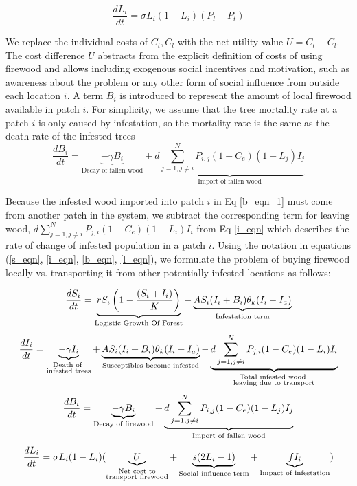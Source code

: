 $$\frac{d L_i}{dt} = \sigma L_i (1 - L_i) (P_l - P_t)$$


We replace the individual costs of $C_t, C_l$ with the net utility value $U = C_t - C_l$. The cost difference $U$ abstracts from the explicit definition of costs of using firewood \cite{barlow2014modelling} and allows including exogenous social incentives and motivation, such as awareness about the problem or any other form of social influence from outside each location $i$.
A term $B_i$ is introduced to represent the amount of local firewood available in patch $i$. For simplicity, we assume that the tree mortality rate at a patch $i$ is only caused by infestation, so the mortality rate is the same as the death rate of the infested trees
\begin{equation}
\label{b_eqn_1}
\frac{d B_i}{dt} = \underbrace{-\gamma B_i}_{\text{Decay of fallen wood}} + \underbrace{d\sum_{j = 1, j\neq i}^N P_{i,j} (1 - C_e) (1 - L_j)I_j}_{\text{Import of fallen wood}}
\end{equation}

Because the infested wood imported into patch $i$ in Eq \ref{b_eqn_1} must come from another patch in the system, we subtract the corresponding term for leaving wood, $d\sum_{j = 1, j\neq i}^N P_{j,i} (1 - C_e) (1 - L_i)I_i$  from Eq \ref{i_eqn} which describes the rate of change of infested population in a patch $i$. Using the notation in equations (\ref{s_eqn}, \ref{i_eqn}, \ref{b_eqn}, \ref{l_eqn}), we formulate the problem of buying firewood locally vs. transporting it from other potentially infested locations as follows: 

\begin{equation}
\frac{d S_i}{dt} = \underbrace{ r S_i\left(1 - \frac{(S_i + I_i)}{K}\right)}_{\text{Logistic Growth Of Forest}} - \underbrace{A S_i (I_i+ B_i)\theta_k(I_i - I_a)}_{\text{Infestation term}}
\protect \label{s_eqn}
\end{equation}
\begin{equation}
\frac{d I_i}{dt} = \underbrace{-\gamma I_i}_{\substack{\text{Death of }\\\text{infested trees}}} + \underbrace{A S_i (I_i+ B_i)\theta_k(I_i - I_a)}_{\text{Susceptibles become infested}}- \underbrace{d\sum_{j = 1, j\neq i}^N P_{j,i} (1 - C_e) (1 - L_i)I_i}_{\substack{\text{Total infested wood }\\\text{leaving due to transport}}}
\protect \label{i_eqn}
\end{equation}
\begin{equation}
\frac{d B_i}{dt} = \underbrace{-\gamma B_i}_{\text{Decay of firewood}} + \underbrace{d\sum_{j = 1, j\neq i}^N P_{i,j} (1 - C_e) (1 - L_j)I_j}_{\text{Import of fallen wood}}
\protect \label{b_eqn}
\end{equation}
\begin{equation}
\frac{d L_i}{dt} = \sigma L_i (1 -L_i)(\underbrace{U}_{\substack{\text{Net cost to}\\\text{transport firewood}}} + \underbrace{s (2 L_i - 1)}_{\text{Social influence term}} + \underbrace{f I_i}_{\text{Impact of infestation}})  
\protect \label{l_eqn}
\end{equation}

